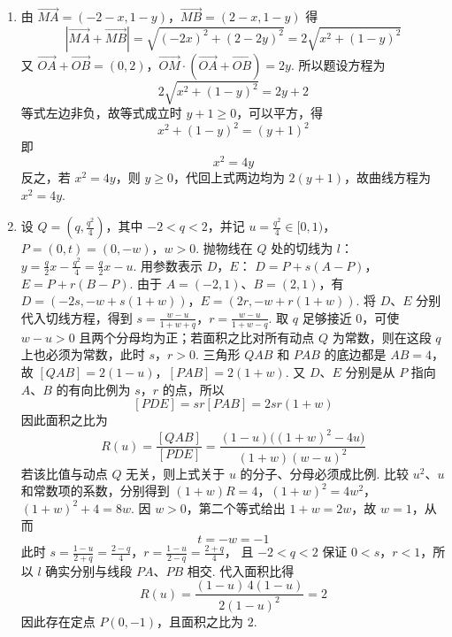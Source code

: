 \begin{solution}
\begin{enumerate}
\item 由
\(\overrightarrow{MA}=(-2-x,1-y)\)，\(\overrightarrow{MB}=(2-x,1-y)\)
得
\[
\left|\overrightarrow{MA}+\overrightarrow{MB}\right|
=\sqrt{(-2x)^2+(2-2y)^2}
=2\sqrt{x^2+(1-y)^2}
\]
又
\(\overrightarrow{OA}+\overrightarrow{OB}=(0,2)\)，\(\overrightarrow{OM}\cdot(\overrightarrow{OA}+\overrightarrow{OB})=2y\).
所以题设方程为
\[
2\sqrt{x^2+(1-y)^2}=2y+2
\]
等式左边非负，故等式成立时 \(y+1\geqslant0\)，可以平方，得
\[
x^2+(1-y)^2=(y+1)^2
\]
即
\[
x^2=4y
\]
反之，若 \(x^2=4y\)，则 \(y\geqslant0\)，代回上式两边均为
\(2(y+1)\)，故曲线方程为 \(x^2=4y\).

\item 设 \(Q=(q,\frac{q^2}{4})\)，其中 \(-2<q<2\)，并记
\(u=\frac{q^2}{4}\in[0,1)\)，\(P=(0,t)=(0,-w)\)，\(w>0\).
抛物线在 \(Q\) 处的切线为
\(l\)：\(y=\frac q2x-\frac{q^2}{4}=\frac q2x-u\).
用参数表示 \(D\)，\(E\)：
\(D=P+s(A-P)\)，\(E=P+r(B-P)\).
由于 \(A=(-2,1)\)、\(B=(2,1)\)，有
\(D=(-2s,-w+s(1+w))\)，\(E=(2r,-w+r(1+w))\).
将 \(D\)、\(E\) 分别代入切线方程，得到
\(s=\frac{w-u}{1+w+q}\)，\(r=\frac{w-u}{1+w-q}\).
取 \(q\) 足够接近 \(0\)，可使 \(w-u>0\) 且两个分母均为正；若面积之比对所有动点 \(Q\) 为常数，则在这段 \(q\) 上也必须为常数，此时 \(s\)，\(r>0\).
三角形 \(QAB\) 和 \(PAB\) 的底边都是 \(AB=4\)，故
\([QAB]=2(1-u)\)，\([PAB]=2(1+w)\).
又 \(D\)、\(E\) 分别是从 \(P\) 指向 \(A\)、\(B\) 的有向比例为 \(s\)，\(r\) 的点，所以
\[
[PDE]=sr[PAB]=2sr(1+w)
\]
因此面积之比为
\[
R(u)=\frac{[QAB]}{[PDE]}
=\frac{(1-u)\bigl((1+w)^2-4u\bigr)}
{(1+w)(w-u)^2}
\]
若该比值与动点 \(Q\) 无关，则上式关于 \(u\) 的分子、分母必须成比例. 比较 \(u^2\)、\(u\) 和常数项的系数，分别得到
\((1+w)R=4\)，\((1+w)^2=4w^2\)，\((1+w)^2+4=8w\).
因 \(w>0\)，第二个等式给出 \(1+w=2w\)，故 \(w=1\)，从而
\[
t=-w=-1
\]
此时
\(s=\frac{1-u}{2+q}=\frac{2-q}{4}\)，\(r=\frac{1-u}{2-q}=\frac{2+q}{4}\)，
且 \(-2<q<2\) 保证 \(0<s\)，\(r<1\)，所以 \(l\) 确实分别与线段 \(PA\)、\(PB\) 相交. 代入面积比得
\[
R(u)=\frac{(1-u)\,4(1-u)}{2(1-u)^2}=2
\]
因此存在定点 \(P(0,-1)\)，且面积之比为 \(2\).
\end{enumerate}
\end{solution}

